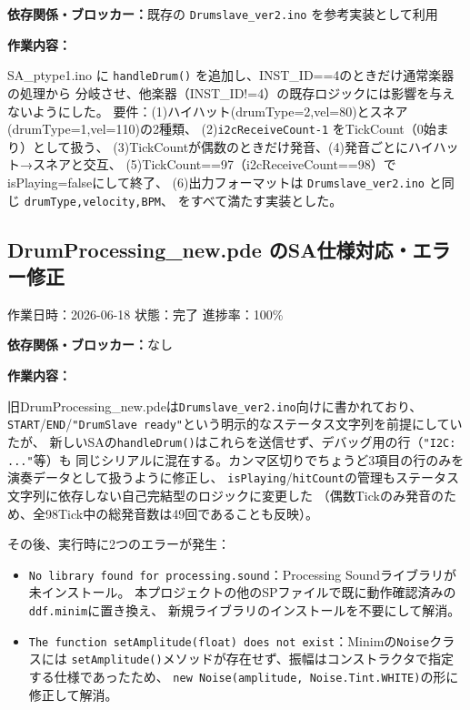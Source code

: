 \documentclass[uplatex,dvipdfmx]{jlreq}
\begin{document}
\noindent
\textbf{依存関係・ブロッカー：}既存の \texttt{Drumslave\_ver2.ino} を参考実装として利用

\noindent
\textbf{作業内容：}

SA\_ptype1.ino に \texttt{handleDrum()} を追加し、INST\_ID==4のときだけ通常楽器の処理から
分岐させ、他楽器（INST\_ID!=4）の既存ロジックには影響を与えないようにした。
要件：(1)ハイハット(drumType=2,vel=80)とスネア(drumType=1,vel=110)の2種類、
(2)\texttt{i2cReceiveCount-1} をTickCount（0始まり）として扱う、
(3)TickCountが偶数のときだけ発音、(4)発音ごとにハイハット→スネアと交互、
(5)TickCount==97（i2cReceiveCount==98）でisPlaying=falseにして終了、
(6)出力フォーマットは \texttt{Drumslave\_ver2.ino} と同じ \texttt{drumType,velocity,BPM}、
をすべて満たす実装とした。

\subsection{DrumProcessing\_new.pde のSA仕様対応・エラー修正}
\noindent
作業日時：2026-06-18 \quad 状態：完了 \quad 進捗率：100\%

\noindent
\textbf{依存関係・ブロッカー：}なし

\noindent
\textbf{作業内容：}

旧DrumProcessing\_new.pdeは\texttt{Drumslave\_ver2.ino}向けに書かれており、
\texttt{START}/\texttt{END}/\texttt{"DrumSlave ready"}という明示的なステータス文字列を前提にしていたが、
新しいSAの\texttt{handleDrum()}はこれらを送信せず、デバッグ用の行（\texttt{"I2C: ..."}等）も
同じシリアルに混在する。カンマ区切りでちょうど3項目の行のみを演奏データとして扱うように修正し、
\texttt{isPlaying}/\texttt{hitCount}の管理もステータス文字列に依存しない自己完結型のロジックに変更した
（偶数Tickのみ発音のため、全98Tick中の総発音数は49回であることも反映）。

その後、実行時に2つのエラーが発生：
\begin{itemize}
    \item \texttt{No library found for processing.sound}：Processing Soundライブラリが未インストール。
    本プロジェクトの他のSPファイルで既に動作確認済みの\texttt{ddf.minim}に置き換え、
    新規ライブラリのインストールを不要にして解消。
    \item \texttt{The function setAmplitude(float) does not exist}：Minimの\texttt{Noise}クラスには
    \texttt{setAmplitude()}メソッドが存在せず、振幅はコンストラクタで指定する仕様であったため、
    \texttt{new Noise(amplitude, Noise.Tint.WHITE)}の形に修正して解消。
\end{itemize}
\end{document}
